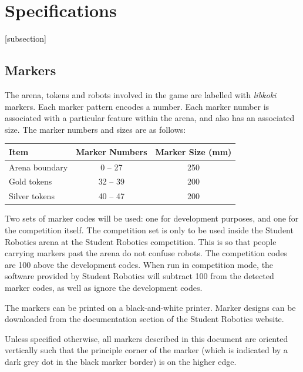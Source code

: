 \section{Specifications}
\label{sec:Specifications}

[subsection]
\newcommand{\rcnii}{\stepcounter{rulei}\arabic{section}.\arabic{subsection}.\arabic{rulei}}
\renewcommand{\labelenumi}{\rcnii}

\subsection{Markers}
\label{sub:markers}
The arena, tokens and robots involved in the game are labelled with \textit{libkoki} markers.
Each marker pattern encodes a number.
Each marker number is associated with a particular feature within the arena, and also has an associated size.
The marker numbers and sizes are as follows:

\begin{center}
  \begin{tabular}{lcc}
    \toprule
    \textbf{Item} & \textbf{Marker Numbers} & \textbf{Marker Size (mm)} \\
    \midrule
    Arena boundary & {} 0 -- 27 & 250 \\
    Gold tokens & {} 32 -- 39 & 200 \\
    Silver tokens & {} 40 -- 47 & 200 \\
    \bottomrule
  \end{tabular}
\end{center}

Two sets of marker codes will be used: one for development purposes, and one for the competition itself.
The competition set is only to be used inside the Student Robotics arena at the Student Robotics competition.
This is so that people carrying markers past the arena do not confuse robots.
The competition codes are 100 above the development codes.
When run in competition mode, the software provided by Student Robotics will subtract 100 from the detected marker codes, as well as ignore the development codes.

The markers can be printed on a black-and-white printer.
Marker designs can be downloaded from the documentation section of the Student Robotics website.

Unless specified otherwise, all markers described in this document are oriented vertically such that the principle corner of the marker (which is indicated by a dark grey dot in the black marker border) is on the higher edge.

